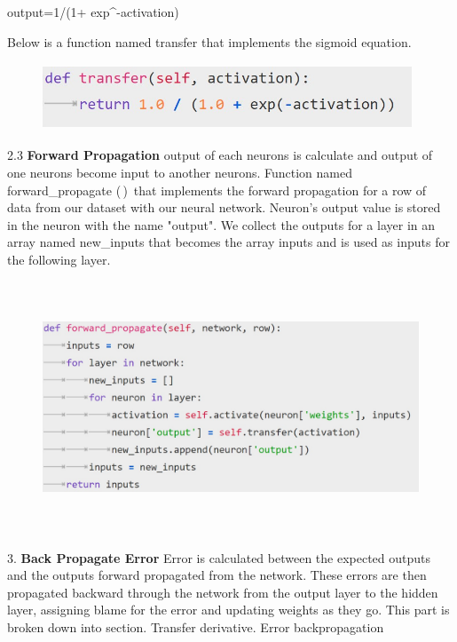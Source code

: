 {output=1/(1+ exp^{-activation})

Below is a function named transfer that implements the sigmoid equation.

\begin{figure}[H]
\begin{center}
\includegraphics[width=110mm,height=20mm]{backexplain/transfer.jpg}
\end{center}
     
\end{figure} 

2.3 \textbf{Forward Propagation}
output of each neurons is calculate and output of one neurons become input to another neurons.\newline
Function named forward\_propagate (\,)\, that implements the forward propagation for a row of data from our dataset with our neural network.
Neuron’s output value is stored in the neuron with the name "output". We collect the outputs for a layer in an array named new\_inputs that becomes the array inputs and is used as inputs for the following layer.

\begin{figure}[H]
\begin{center}
\includegraphics[width=160mm,height=75mm]{backexplain/forward.jpg}
\end{center}
\end{figure} 

3. \textbf{Back Propagate Error}\newline
Error is calculated between the expected outputs and the outputs forward propagated from the network. These errors are then propagated backward through the network from the output layer to the hidden layer, assigning blame for the error and updating weights as they go.\newline
 This part is broken down into section. Transfer derivative. Error backpropagation
 
}
